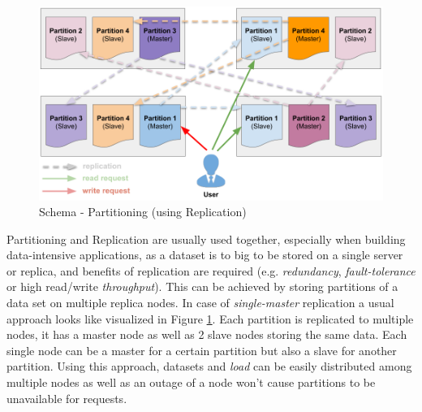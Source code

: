 {\begin{figure}[h]
	\centering
  \includegraphics[width=1\textwidth]{partitioning_schema_replication.png}
	\caption{Schema - Partitioning (using Replication)}
	\label{partitioning_schema_replication}
\end{figure}

Partitioning and Replication are usually used together, especially when building data-intensive applications, as a dataset is to big to be stored on a single server or replica, and benefits of replication are required (e.g. \textit{redundancy}, \textit{fault-tolerance} or high read/write \textit{throughput}). This can be achieved by storing partitions of a data set on multiple replica nodes. In case of \textit{single-master} replication a usual approach looks like visualized in Figure \ref{partitioning_schema_replication}. Each partition is replicated to multiple nodes, it has a master node as well as 2 slave nodes storing the same data. Each single node can be a master for a certain partition but also a slave for another partition. Using this approach, datasets and \textit{load} can be easily distributed among multiple nodes as well as an outage of a node won't cause partitions to be unavailable for requests.\\[0.5 cm]

}
